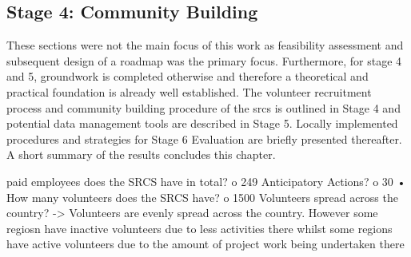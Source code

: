 
\subsection{Stage 4: Community Building} %

These sections were not the main focus of this work as feasibility assessment and subsequent design of a roadmap was the primary focus. Furthermore, for stage 4 and 5, groundwork is completed otherwise and therefore a theoretical and practical foundation is already well established. The volunteer recruitment process and community building procedure of the \acrshort*{srcs} is outlined in Stage 4 and potential data management tools are described in Stage 5. Locally implemented procedures and strategies for Stage 6 Evaluation are briefly presented thereafter. A short summary of the results concludes this chapter.




paid employees does the SRCS have in total?
o	249
Anticipatory Actions?
o	30
•	How many volunteers does the SRCS have?
o	1500
Volunteers spread across the country? 
-> Volunteers are evenly spread across the country.
However some regiosn have inactive volunteers due to less activities there whilst some regions have active volunteers due to the amount of project work being undertaken there









